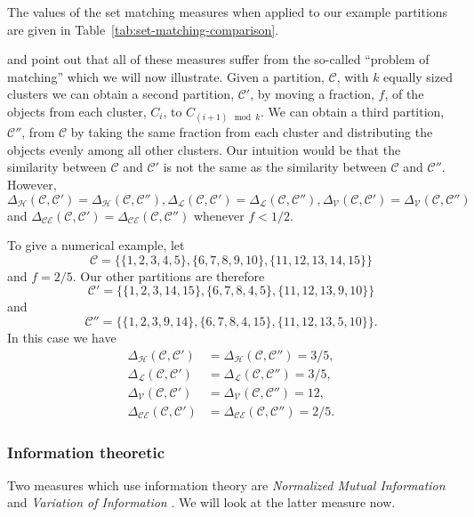 \documentclass[a4paper]{report}
\newcommand{\clus}{\mathcal{C}}
\newcommand{\partcomparep}[1]{\Delta_{\mathcal{#1}}(\clus,\clus')}
\newcommand{\partcomparepp}[1]{\Delta_{\mathcal{#1}}(\clus,\clus'')}
\begin{document}
The values of the set matching measures when applied to our example partitions
are given in Table~\ref{tab:set-matching-comparison}.

\citet{meila-2007} and \citet{bae2010comparison} point out that all of these
measures suffer from the so-called ``problem of matching'' which we will now
illustrate.  Given a partition, $\clus$, with $k$ equally sized clusters we
can obtain a second partition, $\clus'$, by moving a fraction, $f$, of the
objects from each cluster, $C_{i}$, to $C_{(i+1) \mod k}$.  We can obtain a
third partition, $\clus''$, from $\clus$ by taking the same fraction from each
cluster and distributing the objects evenly among all other clusters.  Our
intuition would be that the similarity between $\clus$ and $\clus'$ is not the
same as the similarity between $\clus$ and $\clus''$.  However,
$\partcomparep{H} = \partcomparepp{H}, \partcomparep{L}
= \partcomparepp{L}, \partcomparep{V} = \partcomparepp{V}$ and
$\partcomparep{CE} = \partcomparepp{CE}$ whenever $f < 1/2$.

To give a numerical example, let
\begin{equation*}
  \clus = \{\{1,2,3,4,5\},\{6,7,8,9,10\},\{11,12,13,14,15\}\}
\end{equation*}
and $f = 2/5$.  Our other partitions are therefore
\begin{equation*}
\clus' = \{\{1,2,3,14,15\},\{6,7,8,4,5\},\{11,12,13,9,10\}\}
\end{equation*}
and
\begin{equation*}
\clus'' = \{\{1,2,3,9,14\},\{6,7,8,4,15\},\{11,12,13,5,10\}\}.
\end{equation*}
In this case we have
\begin{align*}
  \partcomparep{H} &= \partcomparepp{H} = 3/5,\\
  \partcomparep{L} &= \partcomparepp{L} = 3/5,\\
  \partcomparep{V} &= \partcomparepp{V} = 12,\\
  \partcomparep{CE} &= \partcomparepp{CE} = 2/5.
\end{align*}


\subsubsection{Information theoretic}
\label{sec:inform-theor}

Two measures which use information theory are \textit{Normalized Mutual
  Information} \citep{fred-jain-2003} and \textit{Variation of Information}
\citep{meila-2007}.  We will look at the latter measure now.
\end{document}

